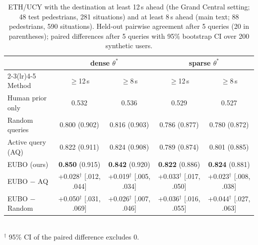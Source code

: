 \begin{table}[h]
\centering
\caption{ETH/UCY with the destination at least 12\,s ahead (the Grand Central setting; 48 test pedestrians, 281 situations) and at least 8\,s ahead (main text; 88 pedestrians, 590 situations). Held-out pairwise agreement after 5 queries (20 in parentheses); paired differences after 5 queries with 95\% bootstrap CI over 200 synthetic users.}
\label{tab:eth_dest}
\setlength{\tabcolsep}{4pt}
\begin{tabular}{lcccc}
\toprule
 & \multicolumn{2}{c}{dense $\theta^*$} & \multicolumn{2}{c}{sparse $\theta^*$} \\
\cmidrule(lr){2-3}\cmidrule(lr){4-5}
Method & $\geq$12\,s & $\geq$8\,s & $\geq$12\,s & $\geq$8\,s \\
\midrule
Human prior only  & 0.532 & 0.536 & 0.529 & 0.527 \\
Random queries    & 0.800 \scriptsize{(0.902)} & 0.816 \scriptsize{(0.903)} & 0.786 \scriptsize{(0.877)} & 0.780 \scriptsize{(0.872)} \\
Active query (AQ) & 0.822 \scriptsize{(0.911)} & 0.824 \scriptsize{(0.908)} & 0.789 \scriptsize{(0.874)} & 0.801 \scriptsize{(0.885)} \\
EUBO (ours)       & \textbf{0.850} \scriptsize{(0.915)} & \textbf{0.842} \scriptsize{(0.920)} & \textbf{0.822} \scriptsize{(0.886)} & \textbf{0.824} \scriptsize{(0.881)} \\
\midrule
EUBO $-$ AQ       & +0.028$^\dagger$ \scriptsize{[.012, .044]} & +0.019$^\dagger$ \scriptsize{[.005, .034]} & +0.033$^\dagger$ \scriptsize{[.017, .050]} & +0.023$^\dagger$ \scriptsize{[.008, .038]} \\
EUBO $-$ Random   & +0.050$^\dagger$ \scriptsize{[.031, .069]} & +0.026$^\dagger$ \scriptsize{[.007, .046]} & +0.036$^\dagger$ \scriptsize{[.016, .055]} & +0.044$^\dagger$ \scriptsize{[.027, .063]} \\
\bottomrule
\end{tabular}
\\[2pt]{\scriptsize $^\dagger$ 95\% CI of the paired difference excludes 0.}
\end{table}
